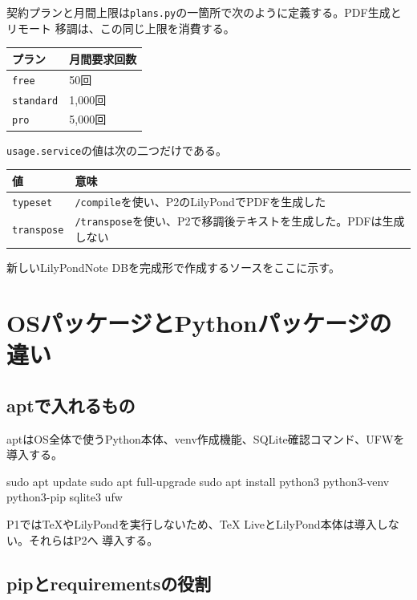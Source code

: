 \documentclass[uplatex,a4paper,11pt]{jsarticle}
\begin{document}
契約プランと月間上限は\texttt{plans.py}の一箇所で次のように定義する。PDF生成とリモート
移調は、この同じ上限を消費する。

\begin{longtable}{@{}p{45mm}p{55mm}@{}}
\toprule
プラン & 月間要求回数\\
\midrule
\texttt{free} & 50回\\
\texttt{standard} & 1,000回\\
\texttt{pro} & 5,000回\\
\bottomrule
\end{longtable}

\texttt{usage.service}の値は次の二つだけである。

\begin{longtable}{@{}p{35mm}p{105mm}@{}}
\toprule
値 & 意味\\
\midrule
\texttt{typeset} & \texttt{/compile}を使い、P2のLilyPondでPDFを生成した\\
\texttt{transpose} & \texttt{/transpose}を使い、P2で移調後テキストを生成した。PDFは生成しない\\
\bottomrule
\end{longtable}

新しいLilyPondNote DBを完成形で作成するソースをここに示す。



\section{OSパッケージとPythonパッケージの違い}

\subsection{aptで入れるもの}

aptはOS全体で使うPython本体、venv作成機能、SQLite確認コマンド、UFWを導入する。

\begin{command}
sudo apt update
sudo apt full-upgrade
sudo apt install python3 python3-venv python3-pip sqlite3 ufw
\end{command}

P1ではTeXやLilyPondを実行しないため、TeX LiveとLilyPond本体は導入しない。それらはP2へ
導入する。

\subsection{pipとrequirementsの役割}
\end{document}
